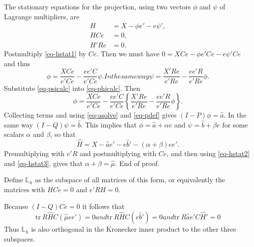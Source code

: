 \documentclass[
  12pt,
  letterpaper,
  DIV=11,
  numbers=noendperiod]{scrartcl}
\begin{document}
The stationary equations for the projection, using two vectors \(\phi\)
and \(\psi\) of Lagrange multipliers, are \begin{subequations}
\begin{align}
H&=X-\phi e'-e\psi',\label{eq-hstat1}\\
HCe &= 0,\label{eq-hstat2}\\
H'Re&=0.\label{eq-hstat3}
\end{align}
\end{subequations} Postmultiply \eqref{eq-hstat1} by \(Ce\). Then we
must have \(0=XCe-\phi e'Ce-e\psi'Ce\) and thus \begin{subequations}
\begin{equation}
\phi=\frac{XCe}{e'Ce}-\frac{ee'C}{e'Ce}\psi.\label{eq-phicalc}
\end{equation}
In the same way
\begin{equation}
\psi=\frac{X'Re}{e'Re}-\frac{ee'R}{e'Re}\phi.\label{eq-psicalc}
\end{equation}
\end{subequations} Substitute \eqref{eq-psicalc} into
\eqref{eq-phicalc}. Then \begin{equation}
\phi=\frac{XCe}{e'Ce}-\frac{ee'C}{e'Ce}\left\{\frac{X'Re}{e'Re}-\frac{ee'R}{e'Re}\phi\right\}.
\end{equation} Collecting terms and using \eqref{eq-asolve} and
\eqref{eq-pdef} gives \((I-P)\phi=\hat a\). In the same way
\((I-Q)\psi=\hat b\). This implies that \(\phi=\hat a+\alpha e\) and
\(\psi=\hat b+\beta e\) for some scalars \(\alpha\) and \(\beta\), so
that \begin{equation}
\hat H=X-\hat ae'-e\hat b'-(\alpha+\beta)ee'.\label{eq-hcalc}
\end{equation} Premultiplying with \(e'R\) and postmultiplying with
\(Ce\), and then using \eqref{eq-hstat2} and \eqref{eq-hstat3}, gives
that \(\alpha+\beta=\hat\mu\). End of proof.

Define \(\mathbb{L}_h\) as the subspace of all matrices of this form, or
equivalently the matrices with \(HCe=0\) and \(e'RH=0\).

Because \((I-Q)Ce=0\) it follows that \begin{subequations}
\begin{equation}
\text{tr}\ R\hat HC(\hat\mu ee')=0
\end{equation}
and 
\begin{equation}
\text{tr}\ R\hat HC(e\hat b')=0
\end{equation}
and
\begin{equation}
\text{tr}\ R\hat ae'C\hat H'=0
\end{equation}
\end{subequations} Thus \(\mathbb{L}_h\) is also orthogonal in the
Kronecker inner product to the other three subspaces.
\end{document}
